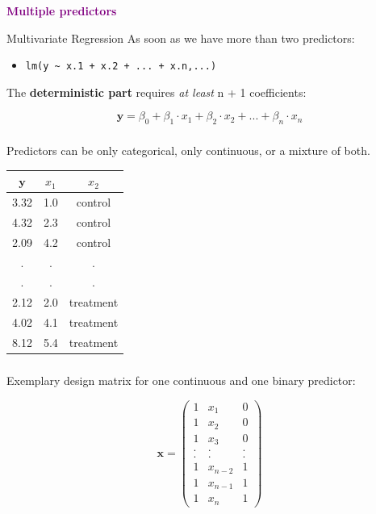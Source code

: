 \documentclass{beamer}
\begin{document}
\begin{frame}{}
  \begin{center}
    \huge\textbf{\textcolor{purple}{Multiple predictors}}
  \end{center}
\end{frame}

\begin{frame}{Multivariate Regression}
  As soon as we have more than two predictors:
  
  \begin{itemize}
      \item \texttt{lm(y \textasciitilde{} x.1 + x.2 + ... + x.n,...)}
  \end{itemize}
  \vspace{0.5cm}
  
  The \textbf{deterministic part} requires \textit{at least} n + 1 coefficients:
  
  \begin{equation*}
    \mathbf{y} = \beta_0 + \beta_1 \cdot x_1 + \beta_2 \cdot x_2 + ... + \beta_n \cdot x_n 
  \end{equation*}
\end{frame}

\begin{frame}
  \frametitle{}
  Predictors can be only categorical, only continuous, or a mixture of both.
  \vspace{0.5cm}
  \begin{table}[h]
    \centering
    \begin{tabular}{ccc}
      \hline
      $\mathbf{y}$ & $x_1$ & $x_2$ \\
      \hline
      3.32 & 1.0 & control \\
      4.32 & 2.3 & control \\
      2.09 & 4.2 & control \\
      . & . & . \\
      . & . & . \\
      2.12 & 2.0 & treatment \\
      4.02 & 4.1 & treatment \\
      8.12 & 5.4 & treatment \\
      \hline
    \end{tabular}
  \end{table}
\end{frame}

\begin{frame}
  \frametitle{}
  Exemplary design matrix for one continuous and one binary predictor:
  
  \begin{equation*}
  \mathbf{x} = \left( \begin{array}{ccc} 1 & x_{1} & 0 \\ 1 & x_{2} & 0 \\ 1 & x_{3} & 0 \\ . & . & . \\ . & . & . \\ 1 & x_{n-2} & 1 \\ 1 & x_{n-1} & 1 \\ 1 & x_n & 1 \end{array}\right)
  \end{equation*}
\end{frame}
\end{document}
